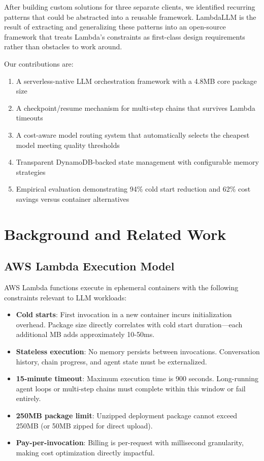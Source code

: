 \documentclass[11pt,a4paper]{article}
\begin{document}
After building custom solutions for three separate clients, we identified recurring patterns that could be abstracted into a reusable framework. LambdaLLM is the result of extracting and generalizing these patterns into an open-source framework that treats Lambda's constraints as first-class design requirements rather than obstacles to work around.

Our contributions are:
\begin{enumerate}
    \item A serverless-native LLM orchestration framework with a 4.8MB core package size
    \item A checkpoint/resume mechanism for multi-step chains that survives Lambda timeouts
    \item A cost-aware model routing system that automatically selects the cheapest model meeting quality thresholds
    \item Transparent DynamoDB-backed state management with configurable memory strategies
    \item Empirical evaluation demonstrating 94\% cold start reduction and 62\% cost savings versus container alternatives
\end{enumerate}

\section{Background and Related Work}

\subsection{AWS Lambda Execution Model}

AWS Lambda functions execute in ephemeral containers with the following constraints relevant to LLM workloads:

\begin{itemize}
    \item \textbf{Cold starts}: First invocation in a new container incurs initialization overhead. Package size directly correlates with cold start duration---each additional MB adds approximately 10-50ms.
    \item \textbf{Stateless execution}: No memory persists between invocations. Conversation history, chain progress, and agent state must be externalized.
    \item \textbf{15-minute timeout}: Maximum execution time is 900 seconds. Long-running agent loops or multi-step chains must complete within this window or fail entirely.
    \item \textbf{250MB package limit}: Unzipped deployment package cannot exceed 250MB (or 50MB zipped for direct upload).
    \item \textbf{Pay-per-invocation}: Billing is per-request with millisecond granularity, making cost optimization directly impactful.
\end{itemize}
\end{document}
